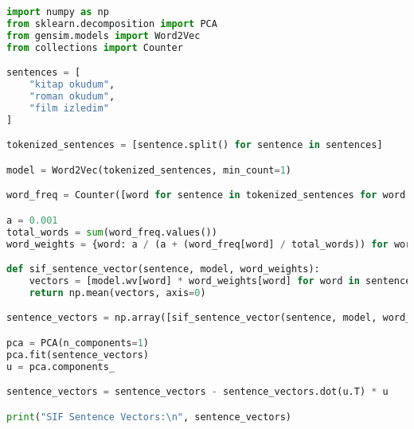 \begin{lstlisting}[language=Python]
import numpy as np
from sklearn.decomposition import PCA
from gensim.models import Word2Vec
from collections import Counter

sentences = [
    "kitap okudum",
    "roman okudum",
    "film izledim"
]

tokenized_sentences = [sentence.split() for sentence in sentences]

model = Word2Vec(tokenized_sentences, min_count=1)

word_freq = Counter([word for sentence in tokenized_sentences for word in sentence])

a = 0.001
total_words = sum(word_freq.values())
word_weights = {word: a / (a + (word_freq[word] / total_words)) for word in word_freq}

def sif_sentence_vector(sentence, model, word_weights):
    vectors = [model.wv[word] * word_weights[word] for word in sentence if word in model.wv]
    return np.mean(vectors, axis=0)

sentence_vectors = np.array([sif_sentence_vector(sentence, model, word_weights) for sentence in tokenized_sentences])

pca = PCA(n_components=1)
pca.fit(sentence_vectors)
u = pca.components_

sentence_vectors = sentence_vectors - sentence_vectors.dot(u.T) * u

print("SIF Sentence Vectors:\n", sentence_vectors)
\end{lstlisting}

\newpage